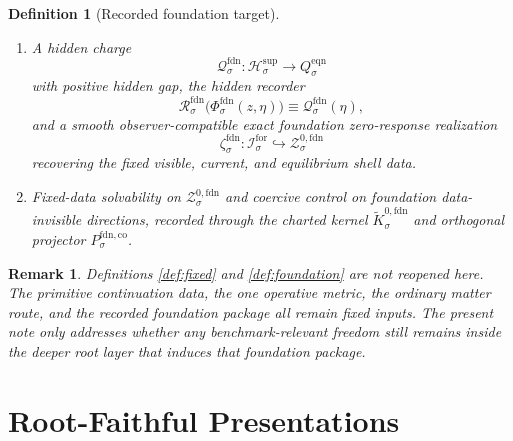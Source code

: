 \documentclass[11pt]{article}
\newcommand{\ForSpace}[1]{\mathcal I_{#1}^{\mathrm{for}}}
\newcommand{\FoundSupportShell}[1]{\mathcal Z_{#1}^{\mathrm{fdn,sup}}}
\newcommand{\FoundZeroCore}[1]{\mathcal Z_{#1}^{0,\mathrm{fdn}}}
\newcommand{\FoundZeroChart}[1]{\Psi_{#1}^{0,\mathrm{fdn}}}
\newcommand{\FoundSplit}[1]{\Phi_{#1}^{\mathrm{fdn}}}
\newcommand{\FoundCharge}[1]{\mathcal Q_{#1}^{\mathrm{fdn}}}
\newcommand{\FoundResidual}[1]{\mathcal R_{#1}^{\mathrm{fdn}}}
\newcommand{\FoundEmbed}[1]{\zeta_{#1}^{\mathrm{fdn}}}
\newcommand{\FoundKernelCh}[1]{\widetilde K_{#1}^{0,\mathrm{fdn}}}
\newcommand{\FoundStateComp}[1]{P_{#1}^{\mathrm{fdn,co}}}
\newcommand{\SeedHidden}[1]{\mathcal H_{#1}^{\mathrm{sup}}}
\newcommand{\SeedHiddenBody}[1]{D_{#1}^{\mathrm{sup}}}
\newcommand{\EqnTarget}[1]{Q_{#1}^{\mathrm{eqn}}}
\newcommand{\EqnZero}[1]{V_{#1}^{\mathrm{eqn},0}}
\newtheorem{definition}{Definition}
\newtheorem{remark}{Remark}
\begin{document}
\begin{definition}[Recorded foundation target]
\begin{enumerate}
\[    \]
    a zero chart
    \[
    \FoundZeroChart{\sigma}:\FoundZeroCore{\sigma}\to\EqnZero{\sigma},
    \]
    and a diffeomorphism
    \[
    \FoundSplit{\sigma}:
    \FoundZeroCore{\sigma}\times\SeedHiddenBody{\sigma}
    \xrightarrow{\cong}
    \FoundSupportShell{\sigma}
    \]
    obeying the same zero/hidden split in the same equation variables.
    \item A hidden charge
    \[
    \FoundCharge{\sigma}:\SeedHidden{\sigma}\to\EqnTarget{\sigma}
    \]
    with positive hidden gap, the hidden recorder
    \[
    \FoundResidual{\sigma}\bigl(\FoundSplit{\sigma}(z,\eta)\bigr)
    \equiv
    \FoundCharge{\sigma}(\eta),
    \]
    and a smooth observer-compatible exact foundation zero-response realization
    \[
    \FoundEmbed{\sigma}:\ForSpace{\sigma}\hookrightarrow\FoundZeroCore{\sigma}
    \]
    recovering the fixed visible, current, and equilibrium shell data.
    \item Fixed-data solvability on \(\FoundZeroCore{\sigma}\) and coercive control on foundation data-invisible directions, recorded through the charted kernel \(\FoundKernelCh{\sigma}\) and orthogonal projector \(\FoundStateComp{\sigma}\).
\end{enumerate}
\end{definition}

\begin{remark}
Definitions \ref{def:fixed} and \ref{def:foundation} are not reopened here. The primitive continuation data, the one operative metric, the ordinary matter route, and the recorded foundation package all remain fixed inputs. The present note only addresses whether any benchmark-relevant freedom still remains inside the deeper root layer that induces that foundation package.
\end{remark}

\section{Root-Faithful Presentations}
\end{document}
